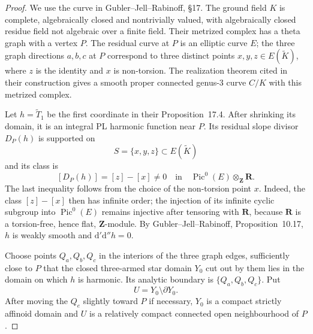 \begin{proof}
We use the curve in Gubler--Jell--Rabinoff, \S17.  The ground field $K$ is
complete, algebraically closed and nontrivially valued, with algebraically
closed residue field not algebraic over a finite field.  Their metrized
complex has a theta graph with a vertex $P$.  The residual curve at $P$ is
an elliptic curve $E$; the three graph directions $a,b,c$ at $P$ correspond
to three distinct points $x,y,z\in E(\widetilde K)$, where $z$ is the
identity and $x$ is non-torsion.  The realization theorem cited in their
construction gives a smooth proper connected genus-$3$ curve $C/K$ with
this metrized complex.

Let $h=\widetilde T_1$ be the first coordinate in their
Proposition~17.4.  After shrinking its domain, it is an integral PL
harmonic function near $P$.  Its residual slope divisor $D_P(h)$ is
supported on
\[
                         S=\{x,y,z\}\subset E(\widetilde K)
\tag{1}\label{eq:p063-support}
\]
and its class is
\[
 [D_P(h)]=[z]-[x]
   \ne0\quad\text{in}\quad
 \operatorname{Pic}^0(E)\otimes_{\mathbf Z}\mathbf R.
\tag{2}\label{eq:p063-nonzero-class}
\]
The last inequality follows from the choice of the non-torsion point $x$.
Indeed, the class $[z]-[x]$ then has infinite order; the injection of its
infinite cyclic subgroup into $\operatorname{Pic}^0(E)$ remains injective
after tensoring with $\mathbf R$, because $\mathbf R$ is a torsion-free,
hence flat, $\mathbf Z$-module.
By Gubler--Jell--Rabinoff, Proposition~10.17, $h$ is weakly smooth and
$\mathrm d'\mathrm d''h=0$.

Choose points $Q_a,Q_b,Q_c$ in the interiors of the three graph edges,
sufficiently close to $P$ that the closed three-armed star domain $Y_0$ cut
out by them lies in the domain on which $h$ is harmonic.  Its analytic
boundary is $\{Q_a,Q_b,Q_c\}$.  Put
\[
                         U=Y_0\setminus\partial Y_0.
\tag{3}\label{eq:p063-open-star}
\]
After moving the $Q_e$ slightly toward $P$ if necessary, $Y_0$ is a compact
strictly affinoid domain and $U$ is a relatively compact connected open
neighbourhood of $P$.


\end{proof}
